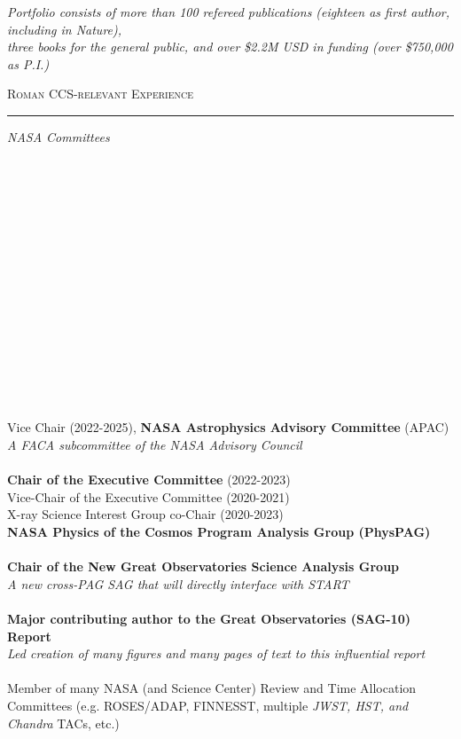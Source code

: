 \documentclass[11pt]{article}
\makeatletter
\def\vhrulefill#1{\leavevmode\leaders\hrule\@height#1\hfill \kern\z@}
\makeatother
\begin{document}
\vspace*{-2mm}

\begin{center}
\textit{Portfolio consists of more than 100 refereed publications (eighteen as first author, including in Nature), \\ three books for the general public, and over \$2.2M USD in funding (over \$750,000 as P.I.) }  \\
\end{center}


\clearpage




\textsc{Roman CCS-relevant Experience} \vhrulefill{0.4pt}


\vspace{3mm}

\hspace{2.5mm} \parbox{1.5in}{\textit{NASA Committees}\\\\\\\\\\\\\\\\\\\\\\\\\\\\\\\\} \parbox{5.15in}{Vice Chair (2022-2025), \textbf{NASA Astrophysics Advisory Committee} (APAC)\\\textit{A FACA subcommittee of the NASA Advisory Council} \\\\\textbf{Chair of the Executive Committee} (2022-2023) \\ Vice-Chair of the Executive Committee (2020-2021) \\ X-ray Science Interest Group co-Chair (2020-2023) \\ \textbf{NASA Physics of the Cosmos Program Analysis Group (PhysPAG)} \\\\ \textbf{Chair of the New Great Observatories Science Analysis Group} \\ \textit{A new cross-PAG SAG that will directly interface with START}\\\\\textbf{Major contributing author to the Great Observatories (SAG-10) Report} \\\textit{Led creation of many figures and many pages of text to this influential report} \\\\ Member of many NASA (and Science Center) Review and Time Allocation Committees (e.g. ROSES/ADAP, FINNESST, multiple \textit{JWST, HST, and Chandra} TACs, etc.)}\\
\end{document}
